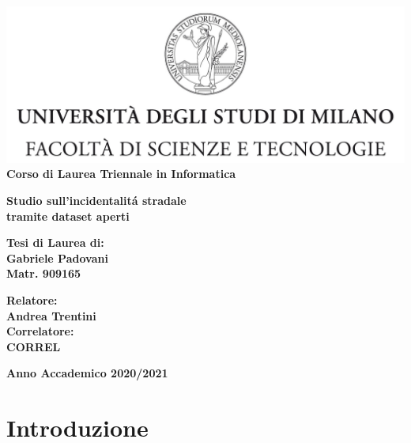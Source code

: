 \documentclass[a4paper]{report}
\begin{document}
\begin{titlepage}
\begin{center}
\includegraphics[width=\textwidth]{Logo.jpg}\\
{\large{\bf Corso di Laurea Triennale in Informatica}}
\end{center}
\vspace{12mm}
\begin{center}
{\huge{\bf Studio sull'incidentalit\'a stradale}}\\
\vspace{4mm}
{\huge{\bf tramite dataset aperti}}\\
\end{center}
\vspace{12mm}
\begin{flushright}
{\large{\bf Tesi di Laurea di:}}\\
{\large{\bf Gabriele Padovani}}\\
{\large{\bf Matr. 909165}}\\
\end{flushright}
\vspace{4mm}
\begin{flushleft}
{\large{\bf Relatore:}}\\
{\large{\bf Andrea Trentini}}\\
\vspace{4mm}
{\large{\bf Correlatore:}}\\
{\large{\bf CORREL}}\\
\end{flushleft}
\vspace{12mm}
\begin{center}
{\large{\bf Anno Accademico 2020/2021}}
\end{center}
\end{titlepage}


\tableofcontents

\listoftodos

\chapter{Introduzione}
\end{document}
